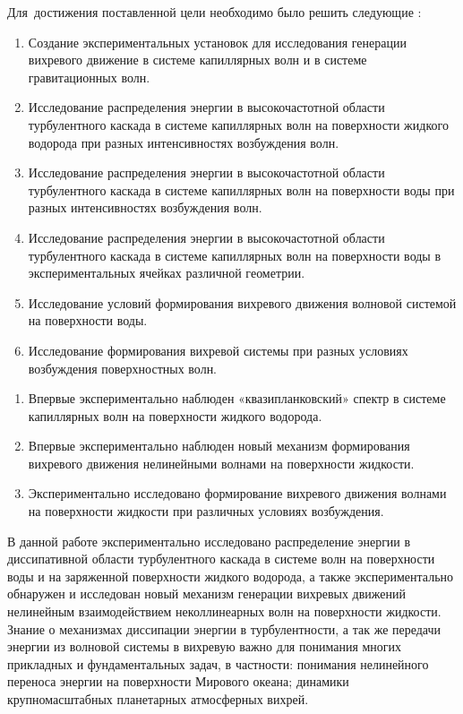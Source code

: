Для~достижения поставленной цели необходимо было решить следующие {\tasks}:
\begin{enumerate}
	\item Создание экспериментальных установок для исследования генерации вихревого движение в системе капиллярных волн и в системе гравитационных волн.
	\item Исследование распределения энергии в высокочастотной области турбулентного каскада в системе капиллярных волн на поверхности жидкого водорода при разных интенсивностях возбуждения волн.
	\item Исследование распределения энергии в высокочастотной области турбулентного каскада в системе капиллярных волн на поверхности воды при разных интенсивностях возбуждения волн.
	\item Исследование распределения энергии в высокочастотной области турбулентного каскада в системе капиллярных волн на поверхности воды в экспериментальных ячейках различной геометрии.
	\item Исследование условий формирования вихревого движения волновой системой на поверхности воды.
	\item Исследование формирования вихревой системы при разных условиях
возбуждения поверхностных волн.
\end{enumerate}

{\novelty}
\begin{enumerate}
	\item Впервые экспериментально наблюден «квазипланковский» спектр в системе капиллярных волн на поверхности жидкого водорода.
	\item Впервые экспериментально наблюден новый механизм формирования вихревого движения нелинейными волнами на поверхности жидкости.
	\item Экспериментально исследовано формирование вихревого движения волнами на поверхности жидкости при различных условиях возбуждения.
	
\end{enumerate}

{\influence}

В данной работе экспериментально исследовано распределение энергии в диссипативной области турбулентного каскада в системе волн на поверхности воды и на заряженной поверхности жидкого водорода, а также экспериментально обнаружен и исследован новый механизм генерации вихревых движений нелинейным взаимодействием неколлинеарных волн на поверхности жидкости. Знание о механизмах диссипации энергии в турбулентности, а так же передачи энергии из волновой системы в вихревую важно для понимания многих прикладных и фундаментальных задач, в частности: понимания нелинейного переноса энергии на поверхности Мирового океана; динамики крупномасштабных планетарных атмосферных вихрей.


